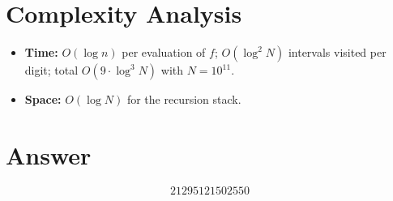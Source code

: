 \documentclass[12pt]{article}
\begin{document}
\section{Complexity Analysis}

\begin{itemize}
    \item \textbf{Time:} $O(\log n)$ per evaluation of $f$; $O(\log^2 N)$ intervals visited per digit; total $O(9 \cdot \log^3 N)$ with $N = 10^{11}$.
    \item \textbf{Space:} $O(\log N)$ for the recursion stack.
\end{itemize}

\section{Answer}

\[
\boxed{21295121502550}
\]
\end{document}
